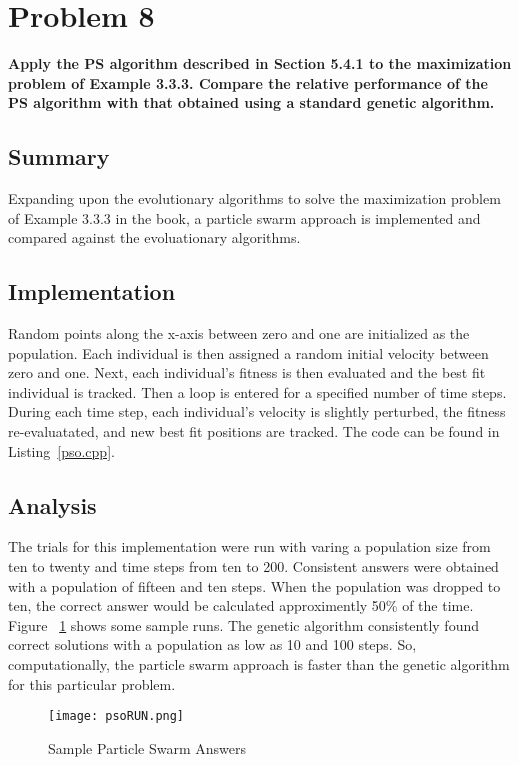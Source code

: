 \section{ Problem 8 }
\textbf{Apply the PS algorithm described in Section 5.4.1 to the maximization problem of Example 3.3.3. Compare the relative performance of the PS algorithm with that obtained using a standard genetic algorithm.} \newline 

\subsection{Summary}
Expanding upon the evolutionary algorithms to solve the maximization problem of Example 3.3.3 in the book, a particle swarm approach is implemented and compared against the evoluationary algorithms.

\subsection{Implementation}
Random points along the x-axis between zero and one are initialized as the population. Each individual is then assigned a random initial velocity between zero and one. Next, each individual's fitness is then evaluated and the best fit individual is tracked. Then a loop is entered for a specified number of time steps. During each time step, each individual's velocity is slightly perturbed, the fitness re-evaluatated, and new best fit positions are tracked. The code can be found in Listing~\ref{pso.cpp}.

\subsection{Analysis}
The trials for this implementation were run with varing a population size from ten to twenty and time steps from ten to 200. Consistent answers were obtained with a population of fifteen and ten steps. When the population was dropped to ten, the correct answer would be calculated approximently 50\% of the time. Figure ~\ref{psoRun} shows some sample runs. The genetic algorithm consistently found correct solutions with a population as low as 10 and 100 steps. So, computationally, the particle swarm approach is faster than the genetic algorithm for this particular problem. 

\begin{figure}[tbh]
\begin{center}
\texttt{[image: psoRUN.png]}
\end{center}
\caption{ Sample Particle Swarm Answers } \label{psoRun}
\end{figure}